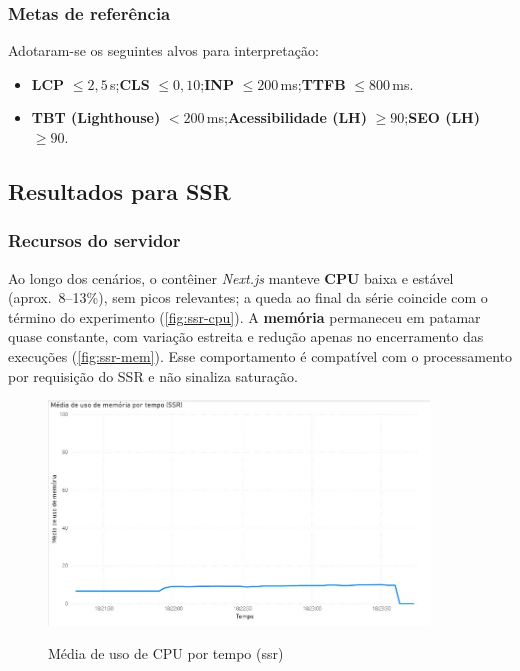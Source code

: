 \subsubsection*{Metas de referência}
Adotaram-se os seguintes alvos para interpretação:
\begin{itemize}
  \item \textbf{LCP} $\leq 2{,}5$\,s;\quad \textbf{CLS} $\leq 0{,}10$;\quad \textbf{INP} $\leq 200$\,ms;\quad \textbf{TTFB} $\leq 800$\,ms.
  \item \textbf{TBT (Lighthouse)} $<200$\,ms;\quad \textbf{Acessibilidade (LH)} $\geq 90$;\quad \textbf{SEO (LH)} $\geq 90$.
\end{itemize}

\subsection{Resultados para SSR}
\label{subsec:resultados-ssr}

\subsubsection*{Recursos do servidor}
Ao longo dos cenários, o contêiner \textit{Next.js} manteve \textbf{CPU} baixa e estável (aprox.\ 8--13\%), sem picos relevantes; a queda ao final da série coincide com o término do experimento (\autoref{fig:ssr-cpu}). A \textbf{memória} permaneceu em patamar quase constante, com variação estreita e redução apenas no encerramento das execuções (\autoref{fig:ssr-mem}). Esse comportamento é compatível com o processamento por requisição do SSR e não sinaliza saturação.

\begin{figure}[H]
  \centering
  \caption{Média de uso de CPU por tempo (\acrshort{ssr})}
  \includegraphics[width=0.9\textwidth]{media/uso_cpu_ssr.jpeg}
  \label{fig:ssr-cpu}
\end{figure}

